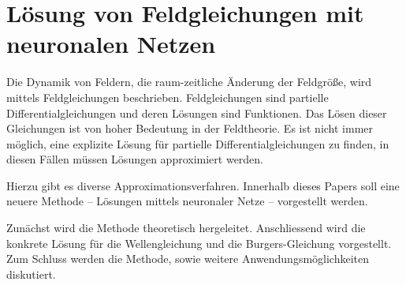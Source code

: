%
%
%
%
\chapter{Lösung von Feldgleichungen mit neuronalen Netzen\label{chapter:neuronal}}
\begin{refsection}

Die Dynamik von Feldern, die raum-zeitliche Änderung der Feldgröße, wird mittels Feldgleichungen beschrieben.
Feldgleichungen sind partielle Differentialgleichungen und deren Lösungen sind Funktionen.
Das Lösen dieser Gleichungen ist von hoher Bedeutung in der Feldtheorie.
Es ist nicht immer möglich, eine explizite Lösung für partielle Differentialgleichungen zu finden, in diesen Fällen müssen Lösungen approximiert werden.

Hierzu gibt es diverse Approximationsverfahren.
Innerhalb dieses Papers soll eine neuere Methode -- Lösungen mittels neuronaler Netze -- vorgestellt werden.

Zunächst wird die Methode theoretisch hergeleitet.
Anschliessend wird die konkrete Lösung für die Wellengleichung und die Burgers-Gleichung vorgestellt.
Zum Schluss werden die Methode, sowie weitere Anwendungsmöglichkeiten diskutiert.






\printbibliography[heading=subbibliography]
\end{refsection}
